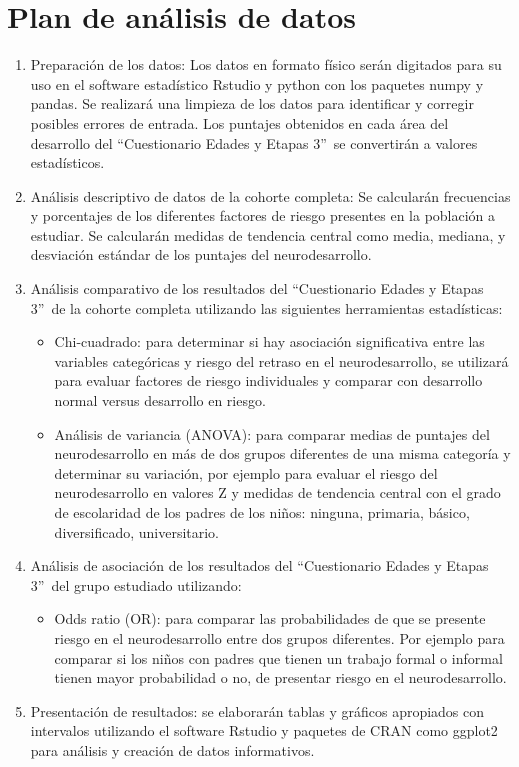 \documentclass[11pt,letterpaper]{report}
\newcommand{\asq}{“Cuestionario Edades y Etapas 3”}
\begin{document}
\section{Plan de análisis de datos}
\begin{enumerate}
	\item Preparación de los datos: Los datos en formato físico serán
	digitados para su uso en el software estadístico Rstudio y python con los
	paquetes numpy y pandas. Se realizará una limpieza de los datos para
	identificar y corregir posibles errores de entrada. Los puntajes obtenidos
	en cada área del desarrollo del \asq\ se convertirán a valores
	estadísticos. 
	
	\item Análisis descriptivo de datos de la cohorte completa: Se calcularán
	frecuencias y porcentajes de los diferentes factores de riesgo presentes en
	la población a estudiar. Se calcularán medidas de tendencia central como
	media, mediana, y desviación estándar de los puntajes del neurodesarrollo.

	\item Análisis comparativo de los resultados del \asq\ de la cohorte
	completa utilizando las siguientes herramientas estadísticas:
		\begin{itemize}
		\item Chi-cuadrado: para determinar si hay asociación significativa
		entre las variables categóricas y riesgo del retraso en el
		neurodesarrollo, se utilizará para evaluar factores de riesgo
		individuales y comparar con desarrollo normal versus desarrollo en
		riesgo.
		\item Análisis de variancia (ANOVA): para comparar medias de puntajes
		del neurodesarrollo en más de dos grupos diferentes de una misma
		categoría y determinar su variación, por ejemplo para evaluar el riesgo
		del neurodesarrollo en valores Z y medidas de tendencia central con
		el grado de escolaridad de los padres de los niños: ninguna, primaria,
		básico, diversificado, universitario.
		\end{itemize}

	\item Análisis de asociación de los resultados del \asq\ del grupo
	estudiado utilizando:
		\begin{itemize}
		\item Odds ratio (OR): para comparar las probabilidades de que se
		presente riesgo en el neurodesarrollo entre dos grupos diferentes.
		Por ejemplo para comparar si los niños con padres que tienen un trabajo
		formal o informal tienen mayor probabilidad o no, de presentar riesgo
		en el neurodesarrollo.
		\end{itemize}
	\item Presentación de resultados: se elaborarán tablas y gráficos
	apropiados con intervalos utilizando el software Rstudio y paquetes de
	CRAN como ggplot2 para análisis y creación de datos informativos.
\end{enumerate}
\end{document}
